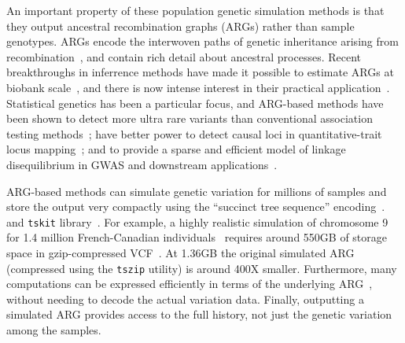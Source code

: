 \documentclass[unnumsec,webpdf,modern,large,namedate]{oup-authoring-template}%
\begin{document}
An important property of these population genetic simulation methods is that
they output ancestral recombination graphs (ARGs)
rather than sample genotypes.
ARGs encode the interwoven paths
of genetic inheritance arising from
recombination~\citep{hudson1983properties,griffiths1997ancestral,wong2023general},
and contain rich detail about ancestral processes.
Recent breakthroughs in inferrence methods have made it possible
to estimate ARGs at biobank scale~\citep{kelleher2019,zhang2023},
and there is now intense interest in their practical
application~\citep{lewanski2023era}.
Statistical genetics has been a particular focus,
and ARG-based methods have been shown
to detect more ultra rare variants than conventional association testing
methods~\citep{zhang2023};
have better power to detect causal loci in
quantitative-trait locus mapping~\citep{link2023tree};
and to provide a sparse and efficient model of linkage disequilibrium
in GWAS and downstream applications~\citep{nowbandegani2023extremely}.

ARG-based methods can simulate genetic variation for millions of
samples and store the output very compactly
using the ``succinct tree sequence'' encoding~\citep{wong2023general}.
and \texttt{tskit} library~\citep{ralph2020}.
For example, a highly realistic simulation
of chromosome 9 for 1.4 million
French-Canadian individuals~\citep{anderson2023}
requires around 550GB of storage space in gzip-compressed
VCF~\citep{danecek2011}.
At 1.36GB the original simulated ARG
(compressed using the \texttt{tszip} utility) is around 400X smaller.
Furthermore, many computations can
be expressed efficiently in terms of the underlying
ARG~\citep{kelleher2016efficient,ralph2020}, without
needing to decode the actual variation data.
Finally, outputting a simulated ARG provides access to the full
history, not just the genetic variation among the samples.
\end{document}
